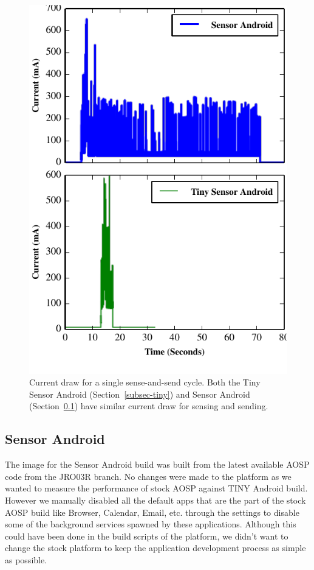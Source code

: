 \begin{figure}[t]
\includegraphics[width=\columnwidth]{./figures/traces.pdf}

\caption{\small Current draw for a single sense-and-send cycle.
\textnormal{Both the Tiny Sensor Android (Section~\ref{subsec-tiny}) and
            Sensor Android (Section~\ref{subsec-full}) have similar current draw for sensing and sending.}}

\label{fig-tinyandroid}
\end{figure}


\subsection{Sensor Android}
\label{subsec-full}

The image for the Sensor Android build was built from the latest available AOSP code 
from the JRO03R branch. No changes were made to the platform as we wanted to measure 
the performance of stock AOSP against TINY Android build.
However we manually disabled all the default apps that are the part of the stock AOSP build like Browser, 
Calendar, Email, etc. through the settings to disable some of the background services spawned by these applications. 
Although this could have been done in the build scripts of the platform, 
we didn't want to change the stock platform to keep the application development process as simple as possible.

